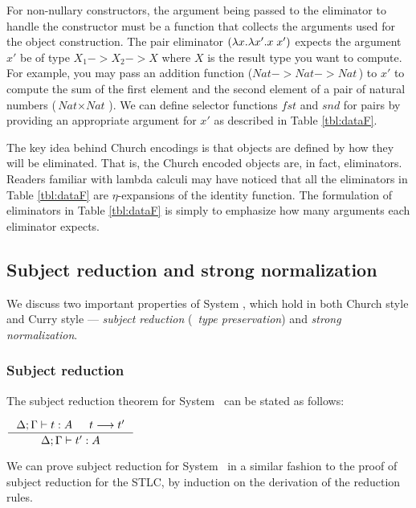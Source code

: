 For non-nullary constructors, the argument being passed to the eliminator
to handle the constructor must be a function that collects the arguments used
for the object construction. The pair eliminator $(\lambda x.\lambda x'.x\;x')$ expects
the argument $x'$ be of type $X_1 -> X_2 -> X$ where $X$ is the result type
you want to compute. For example, you may pass an addition function 
($\textit{Nat} -> \textit{Nat} -> \textit{Nat}\,$) to $x'$ to compute
the sum of the first element and the second element of a pair of
natural numbers ($\textit{Nat}\times\textit{Nat}\,$). We can define
selector functions $\mathit{fst}$ and $\mathit{snd}$ for pairs by
providing an appropriate
argument for $x'$ as described in Table \ref{tbl:dataF}.

The key idea behind Church encodings is that objects are defined by
how they will be eliminated. That is, the Church encoded objects
are, in fact, eliminators. Readers familiar with lambda calculi may have
noticed that all the eliminators in Table \ref{tbl:dataF} are
$\eta$-expansions of the identity function. The formulation of eliminators
in Table \ref{tbl:dataF} is simply to emphasize how many arguments
each eliminator expects.

\subsection{Subject reduction and strong normalization}\label{sec:f:srsn}
We discuss two important properties of System \F, which hold in both
Church style and Curry style --- \emph{subject reduction} (\aka\
\emph{type preservation}) and \emph{strong normalization}.

\subsubsection*{Subject reduction}
The subject reduction theorem for System \F\ can be stated as follows:
\begin{theorem}
$\inference{\Delta;\Gamma |- t : A  & t --> t'}{\Delta;\Gamma |- t' : A}$
\end{theorem}
We can prove subject reduction for System \F\, in a similar fashion
to the proof of subject reduction for the STLC,
by induction on the derivation of the reduction rules.

